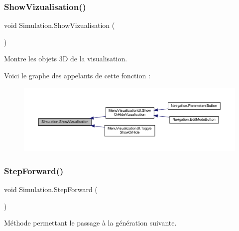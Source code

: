 \subsubsection{\texorpdfstring{Show\+Vizualisation()}{ShowVizualisation()}}
{\footnotesize\ttfamily void Simulation.\+Show\+Vizualisation (\begin{DoxyParamCaption}{ }\end{DoxyParamCaption})\hspace{0.3cm}{\ttfamily [inline]}}



Montre les objets 3D de la visualisation. 

Voici le graphe des appelants de cette fonction \+:
\nopagebreak
\begin{figure}[H]
\begin{center}
\leavevmode
\includegraphics[width=350pt]{class_simulation_acc3c641f3874f1805c3a13d2153b6023_icgraph}
\end{center}
\end{figure}
\mbox{\label{class_simulation_a1ba6581d305c2d60d174e0cffd917719}} 
\subsubsection{\texorpdfstring{Step\+Forward()}{StepForward()}}
{\footnotesize\ttfamily void Simulation.\+Step\+Forward (\begin{DoxyParamCaption}{ }\end{DoxyParamCaption})\hspace{0.3cm}{\ttfamily [inline]}}



Méthode permettant le passage à la génération suivante. 

